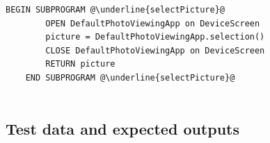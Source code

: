 \documentclass[a4paper, titlepage]{article}
\begin{document}
\vspace{7mm}

\begin{lstlisting}[caption=Select Profile Picture, escapechar=\@]
	BEGIN SUBPROGRAM @\underline{selectPicture}@
		OPEN DefaultPhotoViewingApp on DeviceScreen
		picture = DefaultPhotoViewingApp.selection()
		CLOSE DefaultPhotoViewingApp on DeviceScreen
		RETURN picture
	END SUBPROGRAM @\underline{selectPicture}@
			
\end{lstlisting}


\renewcommand{\rmdefault}{cmr}
\subsection{Test data and expected outputs}
	\vspace{2mm}
\end{document}

